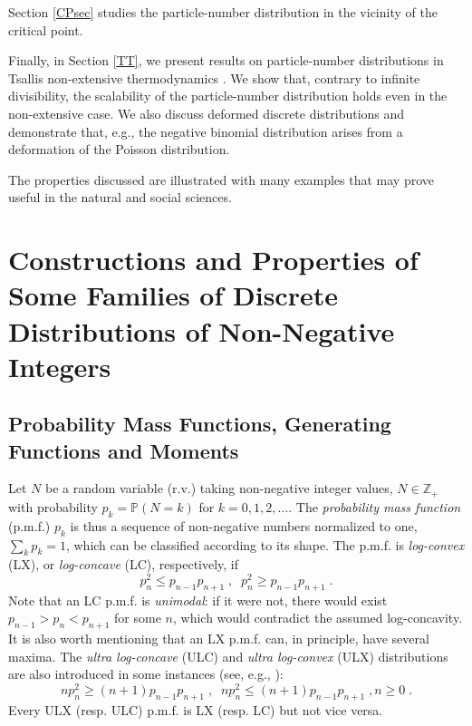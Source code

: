 \documentclass[a4paper,12pt]{amsart}
\newcommand{\Z}{\mathbb{Z}_{+}}
\theoremstyle{definition}
\theoremstyle{remark}
\begin{document}
Section \ref{CPsec} studies the particle-number distribution in the vicinity of the critical point.


Finally, in Section \ref{TT}, we present results on particle-number distributions in Tsallis non-extensive thermodynamics \cite{Tsallis:2009zex}. We show that, contrary to infinite divisibility, the scalability of the particle-number distribution holds even in the non-extensive case. We also discuss deformed discrete distributions and demonstrate that, e.g., the negative binomial distribution arises from a deformation of the Poisson distribution. 

The properties discussed are illustrated with many examples that may prove useful in the natural and social sciences.

\newpage
\section{Constructions and Properties of Some Families of Discrete Distributions of Non-Negative Integers} \label{cons}

\subsection{Probability Mass Functions, Generating Functions and Moments} Let $N$ be a random variable (r.v.) taking non-negative integer values, $N\in \Z $ with probability $p_k=\mathbb{P}(N\!=\!k)$ for $k=0,1,2,\ldots$. The {\it probability mass function} (p.m.f.) $p_k$ is thus a sequence of non-negative numbers normalized to one, $\sum_k p_k=1$, which can be classified according to its shape. The p.m.f. is {\it log-convex} (LX), or {\it log-concave} (LC), respectively, if
\begin{equation} \label{eq:cvx}
p^2_n\leq p_{n-1} p_{n+1} \;,\;\; p^2_n\geq p_{n-1} p_{n+1}\;.
\end{equation}
Note that an LC p.m.f. is {\it unimodal}: if it were not, there would exist $ p_{n-1} > p_n < p_{n+1}$ for some $n$, which would contradict the assumed log-concavity. It is also worth mentioning that an LX p.m.f. can, in principle, have several maxima. The {\it ultra log-concave} (ULC) and {\it ultra log-convex} (ULX) distributions are also introduced in some instances (see, e.g., \cite{Johnson_2013}):
\begin{equation} \label{eq: ulc}
n p^2_n\geq (n+1) p_{n-1} p_{n+1}\;,\;\;n p^2_n\leq (n+1) p_{n-1} p_{n+1}  \;, n\geq 0\;. 
\end{equation}
Every ULX (resp. ULC) p.m.f. is LX (resp. LC) but not vice versa.
\end{document}
